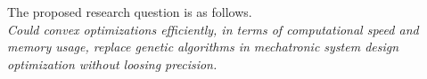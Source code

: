 The proposed research question is as follows.
\\

\textit{Could convex optimizations efficiently, in terms of computational speed and memory usage, replace genetic algorithms in mechatronic system design optimization without loosing precision.} 